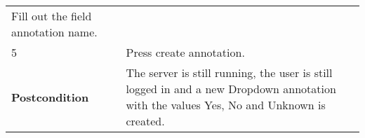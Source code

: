 \begin{longtable}[c]{@{}ll@{}}
\begin{minipage}[t]{0.63\columnwidth}\raggedright\strut
Fill out the field annotation name.
\strut\end{minipage}\tabularnewline
\begin{minipage}[t]{0.31\columnwidth}\raggedright\strut
5
\strut\end{minipage} &
\begin{minipage}[t]{0.63\columnwidth}\raggedright\strut
Press create annotation.
\strut\end{minipage}\tabularnewline
\begin{minipage}[t]{0.31\columnwidth}\raggedright\strut
\textbf{Postcondition}
\strut\end{minipage} &
\begin{minipage}[t]{0.63\columnwidth}\raggedright\strut
The server is still running, the user is still logged in and a new
Dropdown annotation with the values Yes, No and Unknown is created.
\strut\end{minipage}\tabularnewline
\bottomrule
\end{longtable}

